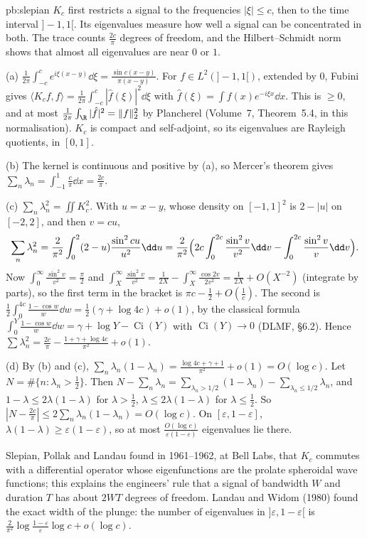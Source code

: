\begin{solution}{pb:slepian}
\idea $K_c$ first restricts a signal to the frequencies $|\xi|\le c$, then to the time interval $]-1,1[$. Its eigenvalues measure how well a signal can be concentrated in both. The trace counts
$\frac{2c}\pi$ degrees of freedom, and the Hilbert--Schmidt norm shows that almost all eigenvalues are near $0$ or $1$.

\writeup (a) $\frac1{2\pi}\int_{-c}^ce^{i\xi(x-y)}\dd\xi=\frac{\sin c(x-y)}{\pi(x-y)}$. For $f\in L^2(]-1,1[)$, extended by $0$, Fubini gives
$\langle K_cf,f\rangle=\frac1{2\pi}\int_{-c}^c|\hat f(\xi)|^2\dd\xi$ with $\hat f(\xi)=\int f(x)e^{-i\xi x}\dd x$. This is $\ge0$, and at most $\frac1{2\pi}\int_\R|\hat f|^2=\|f\|_2^2$ by Plancherel (Volume~7,
Theorem~5.4, in this normalisation). $K_c$ is compact and self-adjoint, so its eigenvalues are Rayleigh quotients, in $[0,1]$.

(b) The kernel is continuous and positive by (a), so Mercer's theorem gives $\sum_n\lambda_n=\int_{-1}^1\frac c\pi\dd x=\frac{2c}\pi$.

(c) $\sum_n\lambda_n^2=\iint K_c^2$. With $u=x-y$, whose density on $[-1,1]^2$ is $2-|u|$ on $[-2,2]$, and then $v=cu$,
\[
\sum_n\lambda_n^2=\frac2{\pi^2}\int_0^2(2-u)\frac{\sin^2cu}{u^2}\dd u=\frac2{\pi^2}\Bigl(2c\int_0^{2c}\frac{\sin^2v}{v^2}\dd v-\int_0^{2c}\frac{\sin^2v}v\dd v\Bigr).
\]
Now $\int_0^\infty\frac{\sin^2v}{v^2}=\frac\pi2$ and $\int_X^\infty\frac{\sin^2v}{v^2}=\frac1{2X}-\int_X^\infty\frac{\cos2v}{2v^2}=\frac1{2X}+O(X^{-2})$ (integrate by parts), so the first term in the bracket is
$\pi c-\frac12+O(\frac1c)$. The second is $\frac12\int_0^{4c}\frac{1-\cos w}w\dd w=\frac12(\gamma+\log4c)+o(1)$, by the classical formula $\int_0^Y\frac{1-\cos w}w\dd w=\gamma+\log Y-\operatorname{Ci}(Y)$
with $\operatorname{Ci}(Y)\to0$ (DLMF, §6.2). Hence $\sum\lambda_n^2=\frac{2c}\pi-\frac{1+\gamma+\log4c}{\pi^2}+o(1)$.

(d) By (b) and (c), $\sum_n\lambda_n(1-\lambda_n)=\frac{\log4c+\gamma+1}{\pi^2}+o(1)=O(\log c)$. Let $N=\#\{n:\lambda_n>\frac12\}$. Then
$N-\sum_n\lambda_n=\sum_{\lambda_n>1/2}(1-\lambda_n)-\sum_{\lambda_n\le1/2}\lambda_n$, and $1-\lambda\le2\lambda(1-\lambda)$ for $\lambda>\frac12$, $\lambda\le2\lambda(1-\lambda)$ for $\lambda\le\frac12$. So
$|N-\frac{2c}\pi|\le2\sum_n\lambda_n(1-\lambda_n)=O(\log c)$. On $[\varepsilon,1-\varepsilon]$, $\lambda(1-\lambda)\ge\varepsilon(1-\varepsilon)$, so at most $\frac{O(\log c)}{\varepsilon(1-\varepsilon)}$ eigenvalues lie there.

\leads Slepian, Pollak and Landau found in 1961--1962, at Bell Labs, that $K_c$ commutes with a differential operator whose eigenfunctions are the prolate spheroidal wave functions; this explains
the engineers' rule that a signal of bandwidth $W$ and duration $T$ has about $2WT$ degrees of freedom. Landau and Widom (1980) found the exact width of the plunge: the number of eigenvalues
in $]\varepsilon,1-\varepsilon[$ is $\frac2{\pi^2}\log\frac{1-\varepsilon}\varepsilon\log c+o(\log c)$.
\end{solution}

